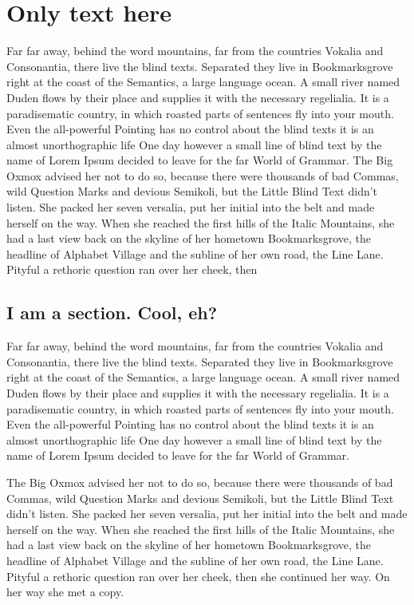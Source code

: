 \chapter{Only text here}
\label{cha:only-text-here}

Far far away, behind the word mountains, far from the countries Vokalia and
Consonantia, there live the blind texts. Separated they live in
Bookmarksgrove right at the coast of the Semantics, a large language
ocean. A small river named Duden flows by their place and supplies it with
the necessary regelialia. It is a paradisematic country, in which roasted
parts of sentences fly into your mouth. Even the all-powerful Pointing has
no control about the blind texts it is an almost unorthographic life One
day however a small line of blind text by the name of Lorem Ipsum decided
to leave for the far World of Grammar. The Big Oxmox advised her not to do
so, because there were thousands of bad Commas, wild Question Marks and
devious Semikoli, but the Little Blind Text didn't listen. She packed her
seven versalia, put her initial into the belt and made herself on the
way. When she reached the first hills of the Italic Mountains, she had a
last view back on the skyline of her hometown Bookmarksgrove, the headline
of Alphabet Village and the subline of her own road, the Line Lane. Pityful
a rethoric question ran over her cheek, then 
 
\section{I am a section. Cool, eh?}
\label{sec:i-am-section}

Far far away, behind the word mountains, far from the countries Vokalia and
Consonantia, there live the blind texts. Separated they live in
Bookmarksgrove right at the coast of the Semantics, a large language
ocean. A small river named Duden flows by their place and supplies it with
the necessary regelialia. It is a paradisematic country, in which roasted
parts of sentences fly into your mouth. Even the all-powerful Pointing has
no control about the blind texts it is an almost unorthographic life One
day however a small line of blind text by the name of Lorem Ipsum decided
to leave for the far World of Grammar. 

The Big Oxmox advised her not to do so, because there were thousands of bad
Commas, wild Question Marks and devious Semikoli, but the Little Blind Text
didn't listen. She packed her seven versalia, put her initial into the belt
and made herself on the way. When she reached the first hills of the Italic
Mountains, she had a last view back on the skyline of her hometown
Bookmarksgrove, the headline of Alphabet Village and the subline of her own
road, the Line Lane. Pityful a rethoric question ran over her cheek, then
she continued her way. On her way she met a copy. 

